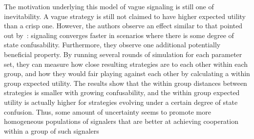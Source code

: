 \documentclass[a4paper]{article}
\begin{document}
The motivation underlying this model of vague signaling is still one of inevitability.
A vague strategy is still not claimed to have higher expected utility than a crisp one.
However, the authors observe an effect similar to that pointed out by~\citeauthor{oconnor_evolution_2014}: signaling converges faster in scenarios where there is some degree of state confusability.
Furthermore, they observe one additional potentially beneficial property.
By running several rounds of simulation for each parameter set, they can measure how close resulting strategies are to each other within each group, and how they would fair playing against each other by calculating a within group expected utility.
The results show that the within group distances between strategies is smaller with growing confusability, and the within group expected utility is actually higher for strategies evolving under a certain degree of state confusion.
Thus, some amount of uncertainty seems to promote more homogeneous populations of signalers that are better at achieving cooperation within a group of such signalers
\end{document}
